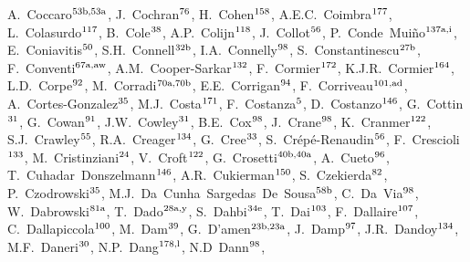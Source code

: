 \begin{flushleft}
A.~Coccaro$^\textrm{\scriptsize 53b,53a}$,    
J.~Cochran$^\textrm{\scriptsize 76}$,    
H.~Cohen$^\textrm{\scriptsize 158}$,    
A.E.C.~Coimbra$^\textrm{\scriptsize 177}$,    
L.~Colasurdo$^\textrm{\scriptsize 117}$,    
B.~Cole$^\textrm{\scriptsize 38}$,    
A.P.~Colijn$^\textrm{\scriptsize 118}$,    
J.~Collot$^\textrm{\scriptsize 56}$,    
P.~Conde~Mui\~no$^\textrm{\scriptsize 137a,i}$,    
E.~Coniavitis$^\textrm{\scriptsize 50}$,    
S.H.~Connell$^\textrm{\scriptsize 32b}$,    
I.A.~Connelly$^\textrm{\scriptsize 98}$,    
S.~Constantinescu$^\textrm{\scriptsize 27b}$,    
F.~Conventi$^\textrm{\scriptsize 67a,aw}$,    
A.M.~Cooper-Sarkar$^\textrm{\scriptsize 132}$,    
F.~Cormier$^\textrm{\scriptsize 172}$,    
K.J.R.~Cormier$^\textrm{\scriptsize 164}$,    
L.D.~Corpe$^\textrm{\scriptsize 92}$,    
M.~Corradi$^\textrm{\scriptsize 70a,70b}$,    
E.E.~Corrigan$^\textrm{\scriptsize 94}$,    
F.~Corriveau$^\textrm{\scriptsize 101,ad}$,    
A.~Cortes-Gonzalez$^\textrm{\scriptsize 35}$,    
M.J.~Costa$^\textrm{\scriptsize 171}$,    
F.~Costanza$^\textrm{\scriptsize 5}$,    
D.~Costanzo$^\textrm{\scriptsize 146}$,    
G.~Cottin$^\textrm{\scriptsize 31}$,    
G.~Cowan$^\textrm{\scriptsize 91}$,    
J.W.~Cowley$^\textrm{\scriptsize 31}$,    
B.E.~Cox$^\textrm{\scriptsize 98}$,    
J.~Crane$^\textrm{\scriptsize 98}$,    
K.~Cranmer$^\textrm{\scriptsize 122}$,    
S.J.~Crawley$^\textrm{\scriptsize 55}$,    
R.A.~Creager$^\textrm{\scriptsize 134}$,    
G.~Cree$^\textrm{\scriptsize 33}$,    
S.~Cr\'ep\'e-Renaudin$^\textrm{\scriptsize 56}$,    
F.~Crescioli$^\textrm{\scriptsize 133}$,    
M.~Cristinziani$^\textrm{\scriptsize 24}$,    
V.~Croft$^\textrm{\scriptsize 122}$,    
G.~Crosetti$^\textrm{\scriptsize 40b,40a}$,    
A.~Cueto$^\textrm{\scriptsize 96}$,    
T.~Cuhadar~Donszelmann$^\textrm{\scriptsize 146}$,    
A.R.~Cukierman$^\textrm{\scriptsize 150}$,    
S.~Czekierda$^\textrm{\scriptsize 82}$,    
P.~Czodrowski$^\textrm{\scriptsize 35}$,    
M.J.~Da~Cunha~Sargedas~De~Sousa$^\textrm{\scriptsize 58b}$,    
C.~Da~Via$^\textrm{\scriptsize 98}$,    
W.~Dabrowski$^\textrm{\scriptsize 81a}$,    
T.~Dado$^\textrm{\scriptsize 28a,y}$,    
S.~Dahbi$^\textrm{\scriptsize 34e}$,    
T.~Dai$^\textrm{\scriptsize 103}$,    
F.~Dallaire$^\textrm{\scriptsize 107}$,    
C.~Dallapiccola$^\textrm{\scriptsize 100}$,    
M.~Dam$^\textrm{\scriptsize 39}$,    
G.~D'amen$^\textrm{\scriptsize 23b,23a}$,    
J.~Damp$^\textrm{\scriptsize 97}$,    
J.R.~Dandoy$^\textrm{\scriptsize 134}$,    
M.F.~Daneri$^\textrm{\scriptsize 30}$,    
N.P.~Dang$^\textrm{\scriptsize 178,l}$,    
N.D~Dann$^\textrm{\scriptsize 98}$,    

\end{flushleft}
